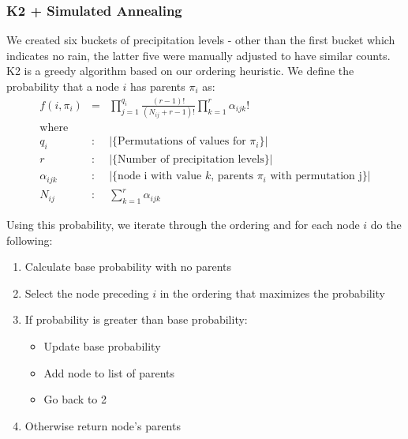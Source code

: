 \documentclass{article}
\begin{document}
\subsubsection{K2 + Simulated Annealing}
We created six buckets of precipitation levels - other than the first bucket which indicates no rain, the latter five were manually adjusted to have similar counts. K2 is a greedy algorithm based on our ordering heuristic. We define the probability that a node $i$ has parents $\pi_i$ as:
\begin{eqnarray*}
  f(i, \pi_i) &=& \prod\limits_{j=1}^{q_i} \frac{(r-1)!}{(N_{ij} + r - 1)!} \prod\limits_{k=1}^{r} \alpha_{ijk}!\\
  \text{where}\\
  q_i &:& |\{\text{Permutations of values for $\pi_i$}\}|\\
  r &:& |\{\text{Number of precipitation levels}\}|\\
  \alpha_{ijk} &:& |\{\text{node i with value $k$, parents $\pi_i$ with permutation j}\}|\\
  N_{ij} &:& \sum\limits_{k=1}^{r} \alpha_{ijk}
\end{eqnarray*}

Using this probability, we iterate through the ordering and for each node $i$ do the following:
\begin{displayquote}
\begin{enumerate}
  \item Calculate base probability with no parents
  \item Select the node preceding $i$ in the ordering that maximizes the probability
  \item If probability is greater than base probability:
    \begin{itemize}
      \item Update base probability
      \item Add node to list of parents
      \item Go back to 2
    \end{itemize}
  \item Otherwise return node's parents
\end{enumerate}
\end{displayquote}
\end{document}
